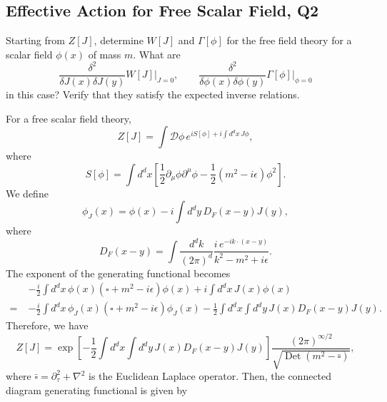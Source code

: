 \subsection{Effective Action for Free Scalar Field, Q2}

Starting from $Z[J]$, determine $W[J]$ and $\Gamma[\phi]$ for the free field theory for a scalar field $\phi(x)$ of mass $m$. What are
\begin{equation}
    \frac{\delta^2}{\delta J(x)\delta J(y)}W[J]\bigg|_{J=0}, \qquad \frac{\delta^2}{\delta\phi(x)\delta\phi(y)}\Gamma[\phi]\bigg|_{\phi=0}
\end{equation}
in this case? Verify that they satisfy the expected inverse relations.
\begin{solution}
For a free scalar field theory,
\begin{equation}
    Z[J] = \int \mathcal{D}\phi\, e^{iS[\phi] + i\int d^dx\, J\phi},
\end{equation}
where 
\begin{equation}
    S[\phi] = \int d^dx \left[\frac{1}{2}\partial_\mu\phi \partial^\mu\phi -\frac{1}{2}(m^2 -i\epsilon)\phi^2\right].
\end{equation}
We define
\begin{equation}
    \phi_J(x) = \phi(x) - i\int d^dy\, D_F(x-y)J(y),
\end{equation}
where
\begin{equation}
    D_F(x-y) = \int \frac{d^dk}{(2\pi)^d}\frac{i\,e^{-ik\cdot (x-y)}}{k^2 - m^2 + i\epsilon}.
\end{equation}
The exponent of the generating functional becomes
\begin{equation}
\begin{aligned}
    &-\frac{i}{2}\int d^dx\,\phi(x)(\square   + m^2 -i\epsilon)\phi(x) + i\int d^dx\, J(x)\phi(x) \\
    =\;& -\frac{i}{2}\int d^dx\,\phi_J(x)(\square   + m^2 -i\epsilon)\phi_J(x) -\frac{1}{2}\int d^dx\int d^dy \, J(x)D_F(x-y)J(y).
\end{aligned}
\end{equation}
Therefore, we have
\begin{equation}
    Z[J] = \exp\!\left[-\frac{1}{2}\int d^dx\int d^dy \, J(x)D_F(x-y)J(y)\right]\frac{(2\pi)^{\infty/2}}{\sqrt{\operatorname{Det}(m^2 - \bar\square) }},
\end{equation}
where $\bar\square = \partial_\tau^2 + \nabla^2$ is the Euclidean Laplace operator.
Then, the connected diagram generating functional is given by
\begin{equation}

\end{equation}
\end{solution}
